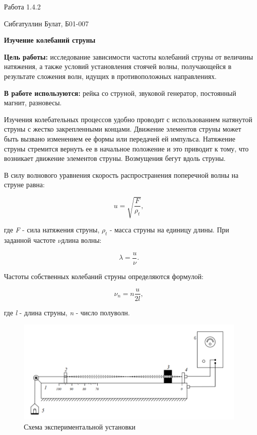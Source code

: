 \documentclass[12pt,a4paper]{article}
\begin{document}
\begin{center}
    \large
    Работа 1.4.2
    
    Сибгатуллин Булат, Б01-007
    
    \vspace{0.5cm}
    \textbf{Изучение колебаний струны}

\end{center}

\vspace{0.5cm}
\textbf{Цель работы:} исследование зависимости частоты колебаний струны от величины натяжения, а также условий установления стоячей волны, получающейся в результате сложения волн, идущих в противоположных направлениях.
    
\vspace{0.5cm}
\textbf{В работе используются:} рейка со струной, звуковой генератор, постоянный магнит, разновесы. 

\vspace{0.5cm}

Изучения колебательных процессов удобно проводит с использованием натянутой струны с жестко закрепленными концами. Движение элементов струны может быть вызвано изменением ее формы или передачей ей импульса. Натяжение струны стремится вернуть ее в начальное положение и это приводит к тому, что возникает движение элементов струны. Возмущения бегут вдоль струны.

В силу волнового уравнения скорость распространения поперечной волны на струне равна:

\begin{equation}
u = \sqrt{\frac{F}{\rho_t}},
\end{equation}

где \textit{F} - сила натяжения струны, $\rho_t$ - масса струны на единицу длины. При заданной частоте $\nu$длина волны:

\begin{equation}
\lambda = \frac{u}{\nu}.
\end{equation}

Частоты собственных колебаний струны определяются формулой:

\begin{equation}
\nu_n = n \frac{u}{2l},
\end{equation}

где \textit{l} - длина струны, \textit{n} - число полуволн.

\begin{figure}[h!]
\centering
\includegraphics[scale=1]{setup.png}
\caption{Схема экспериментальной установки}
\label{fig:setup}
\end{figure}
\end{document}
